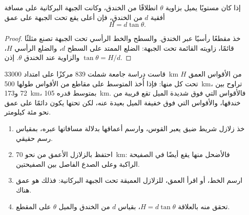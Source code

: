 \begin{proposition}\label{prop:g12:subduction-magmatism:depth}
إذا كان  مستويًا يميل بزاوية $\theta$ انطلاقًا من الخندق،
وكانت الجبهة البركانية على مسافة أفقية $d$ من الخندق، فإن
أعلى  يقع تحت الجبهة على عمق
\[
  H = d \tan\theta .
\]
\end{proposition}

\begin{proof}
خذ مقطعًا رأسيًا عبر الخندق.  والسطح
والخط الرأسي تحت الجبهة تصنع مثلثًا قائمًا، زاويته القائمة
تحت الجبهة: الضلع الممتد على السطح $d$، والضلع الرأسي
$H$، والزاوية عند الخندق $\theta$. إذن $\tan\theta = H/d$.
\end{proof}

قاست دراسة جامعة شملت 839 مركزًا  على امتداد \qty{33000}{km} من الأقواس
العمق $H$ تحت كل منها: فإذا أُخذ المتوسط على مقاطع من الأقواس طولها \qty{500}{km}،
تراوح بين 72 و\qty{173}{km}، بمتوسط قدره \qty{105}{km}. فالأقواس التي فوق
 شديدة الميل تقع قريبة من خندقها، والأقواس التي فوق  خفيفة الميل بعيدة
عنه، لكن  تحتها يكون دائمًا على عمق نحو مئة كيلومتر.

\begin{method}\label{met:g12:subduction-magmatism:slab}
\begin{enumerate}
  \item خذ زلازل شريط ضيق يعبر القوس، وارسم
        أعماقها بدلالة مسافاتها عبره، بمقياس رسم حقيقي.
  \item احتفظ بالزلازل الأعمق من نحو \qty{70}{km}: فالأضحل منها
        يقع أيضًا في الصفيحة الراكبة وعلى الصدع الفاصل بين
        الصفيحتين.
  \item ارسم الخط، أو اقرأ العمق، للزلازل العميقة تحت
        الجبهة البركانية: فذلك هو عمق  هناك.
  \item تحقق منه بالعلاقة $H = d\tan\theta$، بقياس $d$ من الخندق
        والميل $\theta$ على المقطع.
\end{enumerate}
\end{method}

